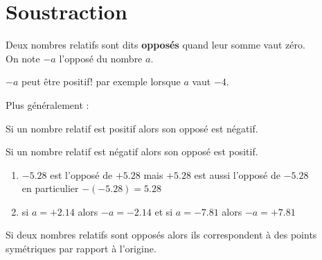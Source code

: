 \section{Soustraction}

\begin{definition}
    Deux nombres relatifs sont dits \textbf{opposés} quand leur somme vaut zéro.\\
    On note $-a$ l'opposé du nombre $a$.
\end{definition}

\begin{remarque}
    $-a$ peut être positif! par exemple lorsque $a$ vaut $-4$.
\end{remarque}

Plus généralement :

\begin{propriete}[\admise]
    Si un nombre relatif est positif alors son opposé est négatif.
\end{propriete}

\begin{propriete}[\admise]
    Si un nombre relatif est négatif alors son opposé est positif.
\end{propriete}

\begin{exemples*1}
    \begin{enumerate}
        \item $\num{-5.28}$ est l'opposé de $+\num{5.28}$ mais $+\num{5.28}$ est aussi l'opposé de $\num{-5.28}$ \\
        en particulier $-(\num{-5.28})=\num{5.28}$
        \item si $a=+\num{2.14}$ alors $-a=\num{-2.14}$ et si $a=\num{-7.81}$ alors $-a=+\num{7.81}$
    \end{enumerate}
\end{exemples*1}

\begin{propriete}
    Si deux nombres relatifs sont opposés alors ils correspondent à des points symétriques par rapport à l'origine.
\end{propriete}

